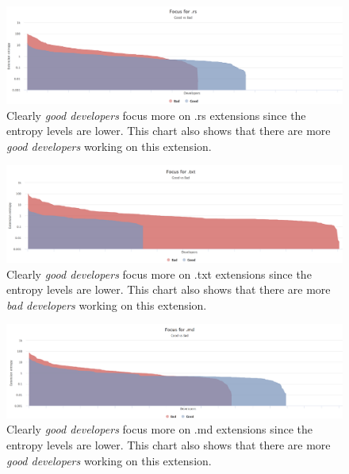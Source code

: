 \begin{figure}[htpb]
  \centering
  \includegraphics[width=1\textwidth]{figures/rs_log}
  \caption[Focus Chart for .rs]{Clearly \textit{good developers} focus more on .rs extensions since the entropy levels are lower. This chart also shows that there are more \textit{good developers} working on this extension.} \label{fig:rs_log_appendix}
\end{figure}

\begin{figure}[htpb]
  \centering
  \includegraphics[width=1\textwidth]{figures/txt_log}
  \caption[Focus Chart for .txt]{Clearly \textit{good developers} focus more on .txt extensions since the entropy levels are lower. This chart also shows that there are more \textit{bad developers} working on this extension.} \label{fig:txt_log_appendix}
\end{figure}

\begin{figure}[htpb]
  \centering
  \includegraphics[width=1\textwidth]{figures/md_log}
  \caption[Focus Chart for .md]{Clearly \textit{good developers} focus more on .md extensions since the entropy levels are lower. This chart also shows that there are more \textit{good developers} working on this extension.} \label{fig:md_log_appendix}
\end{figure}

